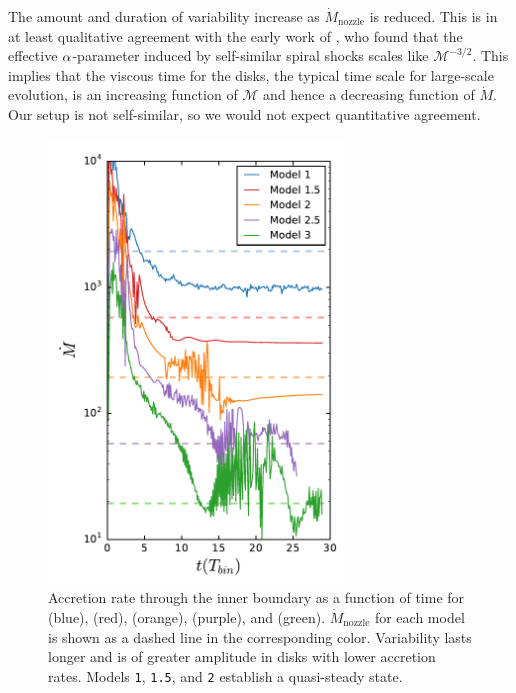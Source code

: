 The amount and duration of variability increase as $\dot{M}_\text{nozzle}$ is reduced.  This is in at least qualitative agreement with the early work of \cite{Spruit87}, who found that the effective $\alpha$-parameter induced by self-similar spiral shocks scales like $\mathcal{M}^{-3/2}$.  This implies that the viscous time for the disks, the typical time scale for large-scale evolution, is an increasing function of $\mathcal{M}$ and hence a decreasing function of $\dot{M}$.  Our setup is not self-similar, so we would not expect quantitative agreement.

\begin{figure}
\begin{center}
\includegraphics[width=0.7\textwidth]{figures/minidisk/mdot_all.pdf}
\end{center}
\caption{ Accretion rate through the inner boundary as a function of time for  (blue),  (red),  (orange),  (purple), and  (green).  $\dot{M}_\text{nozzle}$ for each model is shown as a dashed line in the corresponding color. Variability lasts longer and is of greater amplitude in disks with lower accretion rates.  Models \texttt{1}, \texttt{1.5}, and \texttt{2} establish a quasi-steady state.}
\end{figure}

